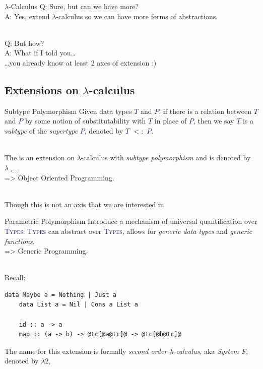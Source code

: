 \documentclass[xcolor={usenames,dvipsnames}]{beamer}
\newcommand{\htycon}[1]{\textcolor{MidnightBlue}{\textsc{#1}}}
\begin{document}
\begin{frame}[fragile]{$\lambda$-Calculus}
  Q: Sure, but can we have more?\\
  \pause
  A: Yes, extend $\lambda$-calculus so we can have more forms of abstractions.

  \ \\
  \pause
  Q: But how?\\
  \pause
  A: What if I told you\ldots\\
  \pause
  \qquad \ldots you already know at least 2 axes of extension :)
\end{frame}


\subsection{Extensions on $\lambda$-calculus}

\begin{frame}[fragile]{Subtype Polymorphism}
  Given data types \htycon{$T$} and \htycon{$P$}, if there is a relation between \htycon{$T$} and \htycon{$P$} by some notion of substitutability with \htycon{$T$} in place of \htycon{$P$}, then we say \htycon{$T$} is a \textit{subtype} of the \textit{supertype} \htycon{$P$}, denoted by \htycon{$T$} $<:$ \htycon{$P$}.

  \ \\
  \pause
  The is an extension on $\lambda$-calculus with \textit{subtype polymorphism} and is denoted by $\lambda_{<:}$.\\
  \pause
  => Object Oriented Programming.
  
  \ \\
  \pause
  Though this is not an axis that we are interested in.
\end{frame}

\begin{frame}[fragile]{Parametric Polymorphism}
  Introduce a mechanism of universal quantification over \htycon{Types}: \htycon{Types} can abstract over \htycon{Types}, allows for \textit{generic data types} and \textit{generic functions}.\\
  \pause
  => Generic Programming.

  \ \\
  \pause
  Recall:
  \begin{lstlisting}[style=hask]
    data Maybe a = Nothing | Just a
    data List a = Nil | Cons a List a

    id :: a -> a
    map :: (a -> b) -> @tc[@a@tc]@ -> @tc[@b@tc]@
  \end{lstlisting}

  \pause
  The name for this extension is formally \textit{second order} $\lambda$\textit{-calculus}, aka \textit{System F}, denoted by $\lambda2$,
\end{frame}
\end{document}
